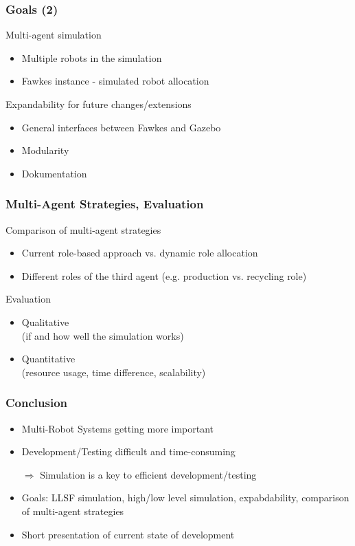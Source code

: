 \documentclass{beamer}
\begin{document}
\begin{frame}
\frametitle{Goals (2)}
Multi-agent simulation
\begin{itemize}
\item Multiple robots in the simulation
\item Fawkes instance - simulated robot allocation
\end{itemize}
Expandability for future changes/extensions
\begin{itemize}
\item General interfaces between Fawkes and Gazebo
\item Modularity
\item Dokumentation
\end{itemize}
\end{frame}

\begin{frame}
\frametitle{Multi-Agent Strategies, Evaluation}
Comparison of multi-agent strategies
\begin{itemize}
\item Current role-based approach vs. dynamic role allocation
\item Different roles of the third agent (e.g. production vs. recycling role)
\end{itemize}
Evaluation
\begin{itemize}
\item Qualitative\\(if and how well the simulation works)
\item Quantitative\\(resource usage, time difference, scalability)
\end{itemize}
\end{frame}

\begin{frame}
\frametitle{Conclusion}
\begin{itemize}
\item Multi-Robot Systems getting more important
\item Development/Testing difficult and time-consuming
\item[$\Rightarrow$] Simulation is a key to efficient development/testing
\item Goals: LLSF simulation, high/low level simulation, expabdability, comparison of multi-agent strategies
\item Short presentation of current state of development
\end{itemize}
\end{frame}
\end{document}
